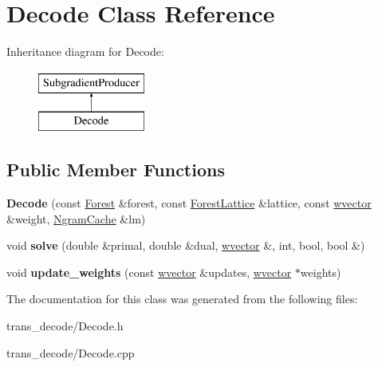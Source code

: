 \hypertarget{classDecode}{
\section{Decode Class Reference}
\label{classDecode}
}
Inheritance diagram for Decode:\begin{figure}[H]
\begin{center}
\leavevmode
\includegraphics[height=2cm]{classDecode}
\end{center}
\end{figure}
\subsection*{Public Member Functions}
\begin{DoxyCompactItemize}
\item 
\hypertarget{classDecode_a57bd53ddaf49e2fe4b86a7aad782110f}{
{\bfseries Decode} (const \hyperlink{classForest}{Forest} \&forest, const \hyperlink{classForestLattice}{ForestLattice} \&lattice, const \hyperlink{classsvector}{wvector} \&weight, \hyperlink{classNgramCache}{NgramCache} \&lm)}
\label{classDecode_a57bd53ddaf49e2fe4b86a7aad782110f}

\item 
\hypertarget{classDecode_a6d86f91ee2c591c54ce2bb97c1dd6888}{
void {\bfseries solve} (double \&primal, double \&dual, \hyperlink{classsvector}{wvector} \&, int, bool, bool \&)}
\label{classDecode_a6d86f91ee2c591c54ce2bb97c1dd6888}

\item 
\hypertarget{classDecode_a9beca60221318f111b7f4d5acca8e329}{
void {\bfseries update\_\-weights} (const \hyperlink{classsvector}{wvector} \&updates, \hyperlink{classsvector}{wvector} $\ast$weights)}
\label{classDecode_a9beca60221318f111b7f4d5acca8e329}

\end{DoxyCompactItemize}


The documentation for this class was generated from the following files:\begin{DoxyCompactItemize}
\item 
trans\_\-decode/Decode.h\item 
trans\_\-decode/Decode.cpp\end{DoxyCompactItemize}
